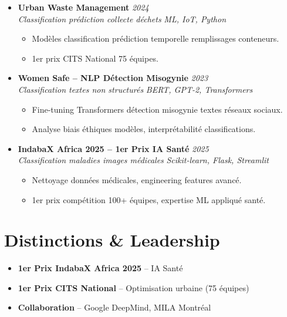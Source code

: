\documentclass[a4paper,11pt]{article}
\begin{document}
\begin{itemize}[leftmargin=0.5cm, nosep]
    \item \textbf{Urban Waste Management} \hfill \textit{2024} \\
    \textit{Classification pr\'ediction collecte d\'echets} \hfill \textit{ML, IoT, Python}
    \vspace{-2pt}
    \begin{itemize}[leftmargin=0.4cm, nosep, label=\tiny$\bullet$]
        \item \small{Mod\`eles classification pr\'ediction temporelle remplissages conteneurs.}
        \item \small{1er prix CITS National 75 \'equipes.}
    \end{itemize}
    \vspace{3pt}

    \item \textbf{Women Safe -- NLP D\'etection Misogynie} \hfill \textit{2023} \\
    \textit{Classification textes non structur\'es} \hfill \textit{BERT, GPT-2, Transformers}
    \vspace{-2pt}
    \begin{itemize}[leftmargin=0.4cm, nosep, label=\tiny$\bullet$]
        \item \small{Fine-tuning Transformers d\'etection misogynie textes r\'eseaux sociaux.}
        \item \small{Analyse biais \'ethiques mod\`eles, interpr\'etabilit\'e classifications.}
    \end{itemize}
    \vspace{3pt}

    \item \textbf{IndabaX Africa 2025 -- 1er Prix IA Sant\'e} \hfill \textit{2025} \\
    \textit{Classification maladies images m\'edicales} \hfill \textit{Scikit-learn, Flask, Streamlit}
    \vspace{-2pt}
    \begin{itemize}[leftmargin=0.4cm, nosep, label=\tiny$\bullet$]
        \item \small{Nettoyage donn\'ees m\'edicales, engineering features avanc\'e.}
        \item \small{1er prix comp\'etition 100+ \'equipes, expertise ML appliqu\'e sant\'e.}
    \end{itemize}
\end{itemize}

\section{Distinctions \& Leadership}
\begin{itemize}[leftmargin=0.5cm, nosep]
    \item \textbf{1er Prix IndabaX Africa 2025} -- IA Sant\'e
    \item \textbf{1er Prix CITS National} -- Optimisation urbaine (75 \'equipes)
    \item \textbf{Collaboration} -- Google DeepMind, MILA Montr\'eal
\end{itemize}
\end{document}

